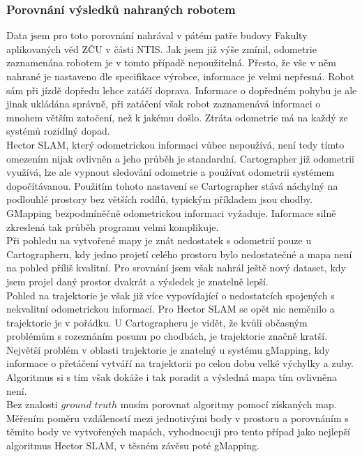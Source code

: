 \documentclass[12pt]{article}
\begin{document}
\subsubsection{Porovnání výsledků nahraných robotem}
Data jsem pro toto porovnání nahrával v pátém patře budovy Fakulty aplikovaných věd ZČU v části NTIS. Jak jsem již výše zmínil, odometrie zaznamenána robotem je v tomto případě nepoužitelná. Přesto, že vše v něm nahrané je nastaveno dle specifikace výrobce, informace je velmi nepřesná. Robot sám při jízdě dopředu lehce zatáčí doprava. Informace o dopředném pohybu je ale jinak ukládána správně, při zatáčení však robot zaznamenává informaci o mnohem větším zatočení, než k jakému došlo. Ztráta odometrie má na každý ze systémů rozídlný dopad.\\
\indent Hector SLAM, který odometrickou informaci vůbec nepoužívá, není tedy tímto omezením nijak ovlivněn a jeho průběh je standardní. Cartographer již odometrii využívá, lze ale vypnout sledování odometrie a používat odometrii systémem dopočítávanou. Použitím tohoto nastavení se Cartographer stává náchylný na podlouhlé prostory bez větších rodílů, typickým příkladem jsou chodby. GMapping bezpodmíněčně odometrickou informaci vyžaduje. Informace silně zkreslená tak průběh programu velmi komplikuje.\\
\indent Při pohledu na vytvořené mapy je znát nedostatek s odometrií pouze u Cartographeru, kdy jedno projetí celého prostoru bylo nedostatečné a mapa není na pohled příliš kvalitní. Pro srovnání jsem však nahrál ještě nový dataset, kdy jsem projel daný prostor dvakrát a výsledek je znatelně lepší.\\
\indent Pohled na trajektorie je však již více vypovídající o nedostatcích spojených s nekvalitní odometrickou informací. Pro Hector SLAM se opět nic neměnilo a trajektorie je v pořádku. U Cartographeru je vidět, že kvůli občasným problémům s rozeznáním posunu po chodbách, je trajektorie značně kratší. Největší problém v oblasti trajektorie je znatelný u systému gMapping, kdy informace o přetáčení vytváří na trajektorii po celou dobu velké výchylky a zuby. Algoritmus si s tím však dokáže i tak poradit a výsledná mapa tím ovlivněna není.\\
\indent Bez znalosti $ground$ $truth$ musím porovnat algoritmy pomocí získaných map. Měřením poměru vzdáleností mezi jednotivými body v prostoru a porovnáním s těmito body ve vytvořených mapách, vyhodnocuji pro tento případ jako nejlepší algoritmus Hector SLAM, v těsném závěsu poté gMapping. 
\end{document}
